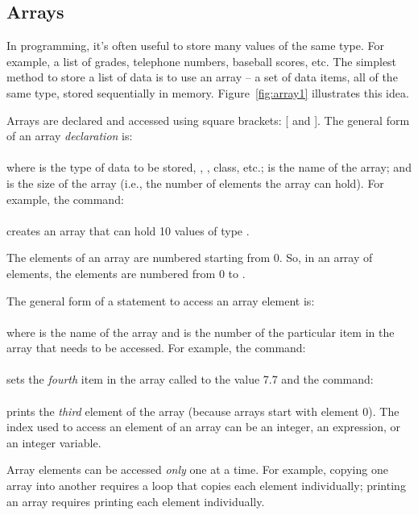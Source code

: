 \subsection{Arrays}

In programming, it's often useful to store many values of the same type.  For example, a list of grades, telephone numbers, baseball scores, etc.  The simplest method to store a list of data is to use an array -- a set of data items, all of the same type, stored sequentially in memory.  
Figure~\ref{fig:array1} illustrates this idea.

Arrays are declared and accessed using square brackets: [ and ].  The general form of an array \emph{declaration} is:\\
\\
where  is the type of data to be stored, , , class, etc.;  is the name of the array; and  is the size of the array (i.e., the number of elements the array can hold).  For example, the command:\\
\\
creates an array that can hold 10 values of type .


The elements of an array are numbered starting from 0.  So, in an array of  elements, the elements are numbered from $0$ to .  

The general form of a statement to access an array element is:\\
\\
where  is the name of the array and  is the number of the particular item in the array that needs to be accessed.  For example, the command:\\
\\
sets the \emph{fourth} item in the array called  to the value 7.7 and the command:\\
\\
prints the \emph{third} element of the array (because arrays start with element 0).   The index used to access an element of an array can be an integer, an expression, or an integer variable.

Array elements can be accessed \emph{only} one at a time.  For example, copying one array into another requires a loop that copies each element individually; printing an array requires printing each element individually.  

